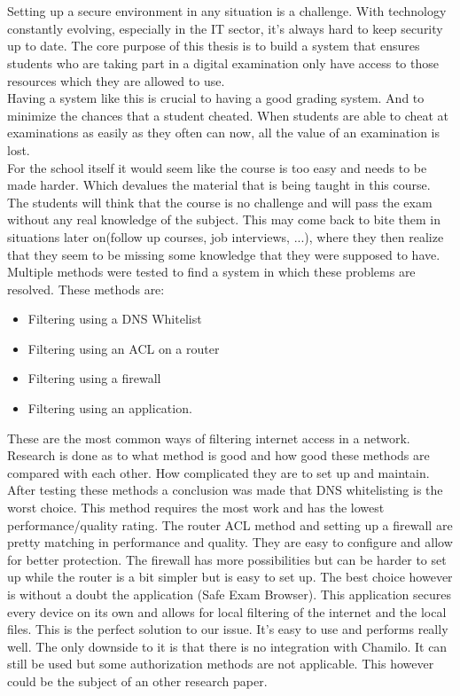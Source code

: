 \chapter*{}
Setting up a secure environment in any situation is a challenge. With technology constantly evolving, especially in the IT sector, it's always hard to keep security up to date. The core purpose of this thesis is to build a system that ensures students who are taking part in a digital examination only have access to those resources which they are allowed to use. \\ Having a system like this is crucial to having a good grading system. And to minimize the chances that a student cheated. When students are able to cheat at examinations as easily as they often can now, all the value of an examination is lost.\\ For the school itself it would seem like the course is too easy and needs to be made harder. Which devalues the material that is being taught in this course.  \\
The students will think that the course is no challenge and will pass the exam without any real knowledge of the subject. This may come back to bite them in situations later on(follow up courses, job interviews, ...), where they then realize that they seem to be missing some knowledge that they were supposed to have.\\
Multiple methods were tested to find a system in which these problems are resolved. These methods are:
\begin{itemize}
\item Filtering using a DNS Whitelist
\item Filtering using an ACL on a router
\item Filtering using a firewall
\item Filtering using an application.
\end{itemize}
These are the most common ways of filtering internet access in a network. Research is done as to what method is good and how good these methods are compared with each other. How complicated they are to set up and maintain. After testing these methods a conclusion was made that DNS whitelisting is the worst choice. This method requires the most work and has the lowest performance/quality rating. The router ACL method and setting up a firewall are pretty matching in performance and quality. They are easy to configure and allow for better protection. The firewall has more possibilities but can be harder to set up while the router is a bit simpler but is easy to set up. The best choice however is without a doubt the application (Safe Exam Browser). This application secures every device on its own and allows for local filtering of the internet and the local files. This is the perfect solution to our issue. It's easy to use and performs really well. The only downside to it is that there is no integration with Chamilo. It can still be used but some authorization methods are not applicable. This however could be the subject of an other research paper.